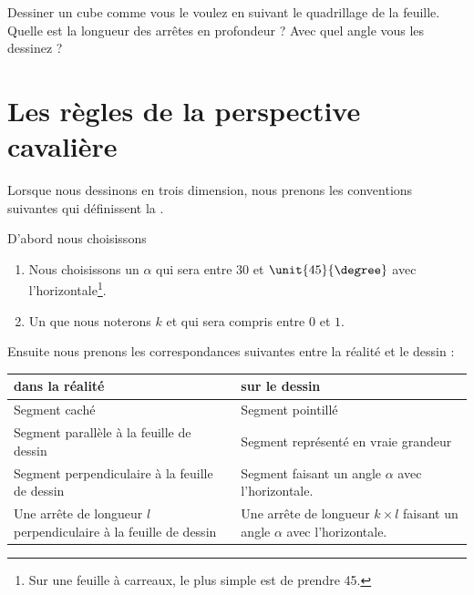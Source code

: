 
\begin{example}
    Dessiner un cube comme vous le voulez en suivant le quadrillage de la feuille. Quelle est la longueur des arrêtes en profondeur ? Avec quel angle vous les dessinez ?
\end{example}

\section{Les règles de la perspective cavalière}

Lorsque nous dessinons en trois dimension, nous prenons les conventions suivantes qui définissent la .

\begin{Aretenir}
    D'abord nous choisissons
    \begin{enumerate}
        \item
            Nous choisissons un  \( \alpha\) qui sera entre \unit{30}{\degree} et \( \unit{45}{\degree}\) avec l'horizontale\footnote{Sur une feuille à carreaux, le plus simple est de prendre \unit{45}{\degree}.}.
        \item
            Un  que nous noterons \( k\) et qui sera compris entre \( 0\) et \( 1\).
    \end{enumerate}

    Ensuite nous prenons les correspondances suivantes entre la réalité et le dessin :
    \begin{center}
        \begin{tabular}{|p{7.5cm}|p{7.5cm}|}
            \hline
            {\bf dans la réalité}&{\bf sur le dessin}\\
            \hline\hline
            Segment caché  & Segment pointillé\\
            \hline
            Segment parallèle à la feuille de dessin & Segment représenté en vraie grandeur\\
            \hline
            Segment perpendiculaire à la feuille de dessin & Segment faisant un angle \( \alpha\) avec l'horizontale.\\
            \hline
            Une arrête de longueur \( l\) perpendiculaire à la feuille de dessin & Une arrête de longueur \( k\times l\) faisant un angle \( \alpha\) avec l'horizontale.\\
            \hline
        \end{tabular}
    \end{center}
\end{Aretenir}

